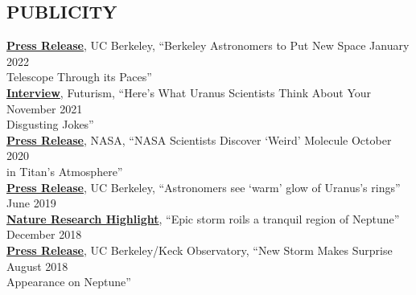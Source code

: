 \documentclass[margin, 10pt]{res} %
\newcommand\tab[1][1cm]{\hspace*{#1}}
\begin{document}
\begin{resume}
\section{PUBLICITY}
\href{https://news.berkeley.edu/2022/01/25/berkeley-astronomers-to-put-new-space-telescope-through-its-paces/}{{\bf Press Release}}, UC Berkeley, ``Berkeley Astronomers to Put New Space \hfill January 2022 \\Telescope Through its Paces'' \\
\href{https://futurism.com/scientists-gross-uranus-jokes}{{\bf Interview}}, Futurism, ``Here's What Uranus Scientists Think About Your  \hfill November 2021 \\
\tab Disgusting Jokes''  \\
\href{https://www.nasa.gov/feature/goddard/2020/nasa-scientists-discover-a-weird-molecule-in-titan-s-atmosphere}{{\bf Press Release}}, NASA, ``NASA Scientists Discover `Weird' Molecule \hfill October 2020 \\
\tab in Titan's Atmosphere''  \\
\href{https://news.berkeley.edu/2019/06/20/astronomers-see-warm-glow-of-uranuss-rings/}{{\bf Press Release}}, UC Berkeley, ``Astronomers see `warm' glow of Uranus's rings'' \hfill June 2019 \\ 
\href{https://www.nature.com/articles/d41586-018-07622-4}{{\bf Nature Research Highlight}}, ``Epic storm roils a tranquil region of Neptune'' \hfill December 2018 \\
\href{http://www.keckobservatory.org/new_storm_makes_surprise_appearance_on_neptune/}{{\bf Press Release}}, UC Berkeley/Keck Observatory, ``New Storm Makes Surprise \hfill August 2018 \\
	\tab Appearance on Neptune'' \\ %






\end{resume}
\end{document}
